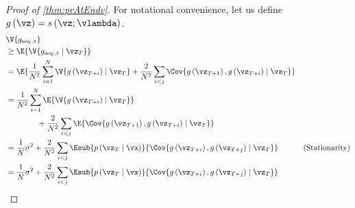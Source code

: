 \label{proofsection:prAtEndv}\begin{proof}[Proof of \autoref{thm:prAtEndv}]\label{proof:prAtEndv}For notational convenience, let us define \(g\left (\vz \right ) = s\left (\vz ; \vlambda \right )\). \begin {align} &\V {g_{\mathrm {seq., t}}} \\ &\geq \E { \V {g_{\mathrm {seq., t}} \mid \vz _{T}} } \\ &= \E { \frac {1}{N^2} \sum ^{N}_{i=1} \V { g\left (\vz _{T+i}\right ) \mid \vz _{T} } + \frac {2}{N^2} \sum _{i<j} \Cov {g\left (\vz _{T+1}\right ), g\left (\vz _{T+i}\right ) \mid \vz _{T} } } \\ &= \frac {1}{N^2} \sum ^{N}_{i=1} \E { \V { g\left (\vz _{T+i}\right ) \mid \vz _{T} } }\\ &\qquad \qquad + \frac {2}{N^2} \sum _{i<j} \E { \Cov {g\left (\vz _{T+1}\right ), g\left (\vz _{T+i}\right ) \mid \vz _{T} } } \\ &= \frac {1}{N} \sigma ^2 + \frac {2}{N^2} \sum _{i < j} \Esub {p\left (\vz _T\mid \vx \right )}{ \Cov { g\left (\vz _{T+i}\right ), g\left (\vz _{T+j}\right ) \mid \vz _T} } &\text {(Stationarity)} \\ &= \frac {1}{N} \sigma ^2 + \frac {2}{N^2} \sum _{i < j} \Esub {p\left (\vz _T\mid \vx \right )}{ \Cov { g\left (\vz _{T+i}\right ), g\left (\vz _{T+j}\right ) \mid \vz _T} } \end {align}\end{proof}
\prAtEndRestatevi*
